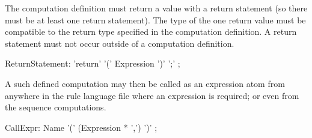 The computation definition must return a value with a return statement (so there must be at least one return statement).
The type of the one return value must be compatible to the return type specified in the computation definition.
A return statement must not occur outside of a computation definition.

\begin{rail}
  ReturnStatement: 'return' '(' Expression ')' ';' ;
\end{rail}

A such defined computation may then be called as an expression atom from anywhere in the rule language file where an expression is required; or even from the sequence computations.

\begin{rail}
  CallExpr: Name '(' (Expression * ',') ')' ;
\end{rail}
